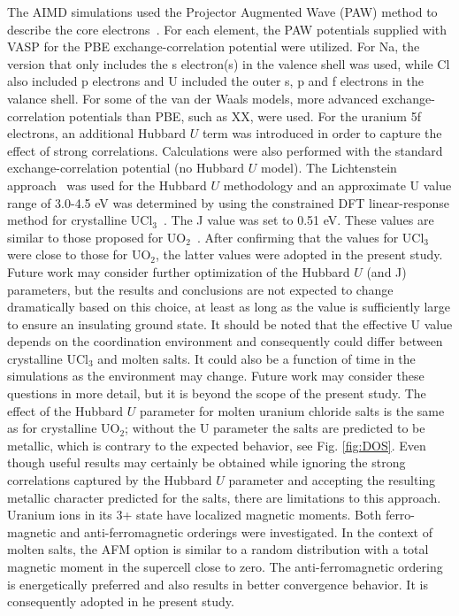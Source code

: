 \documentclass[preprint,3p,10pt,twocolumn,number,sort&compress]{elsarticle}
\begin{document}
The AIMD simulations used the Projector Augmented Wave (PAW) method to describe the core electrons~\cite{}. For each element, the PAW potentials supplied with VASP for the PBE exchange-correlation potential were utilized. For Na, the version that only includes the s electron(s) in the valence shell was used, while Cl also included p electrons and U included the outer s, p and f electrons in the valance shell. For some of the van der Waals models, more advanced exchange-correlation potentials than PBE, such as XX, were used.
For the uranium 5f electrons, an additional Hubbard $U$  term was introduced in order to capture the effect of strong correlations. Calculations were also performed with the standard exchange-correlation potential (no Hubbard $U$ model). The Lichtenstein approach~\cite{} was used for the Hubbard $U$  methodology and an approximate U value range of  3.0-4.5 eV was determined by using the constrained DFT linear-response method for crystalline UCl$_3$~\cite{}. The J value was set to 0.51 eV. These values are similar to those proposed for UO$_2$~\cite{}. After confirming that the values for UCl$_3$ were close to those for UO$_2$, the latter values were adopted in the present study. Future work may consider further optimization of the Hubbard $U$  (and J) parameters, but the results and conclusions are not expected to change dramatically based on this choice, at least as long as the value is sufficiently large to ensure an insulating ground state. It should be noted that the effective U value depends on the coordination environment and consequently could differ between crystalline UCl$_3$ and molten salts. It could also be a function of time in the simulations as the environment may change. Future work may consider these questions in more detail, but it is beyond the scope of the present study. The effect of the Hubbard $U$  parameter for molten uranium chloride salts is the same as for crystalline UO$_2$; without the U parameter the salts are predicted to be metallic, which is contrary to the expected behavior, see Fig. \ref{fig:DOS}. Even though useful results may certainly be obtained while ignoring the strong correlations captured by the Hubbard $U$  parameter and accepting the resulting metallic character predicted for the salts, there are limitations to this approach. Uranium ions in its 3+ state have localized magnetic moments. Both ferro-magnetic and anti-ferromagnetic orderings were investigated. In the context of molten salts, the AFM option is similar to a random distribution with a total magnetic moment in the supercell close to zero. The anti-ferromagnetic ordering is energetically preferred and also results in better convergence behavior. It is consequently adopted in he present study. 
\end{document}
